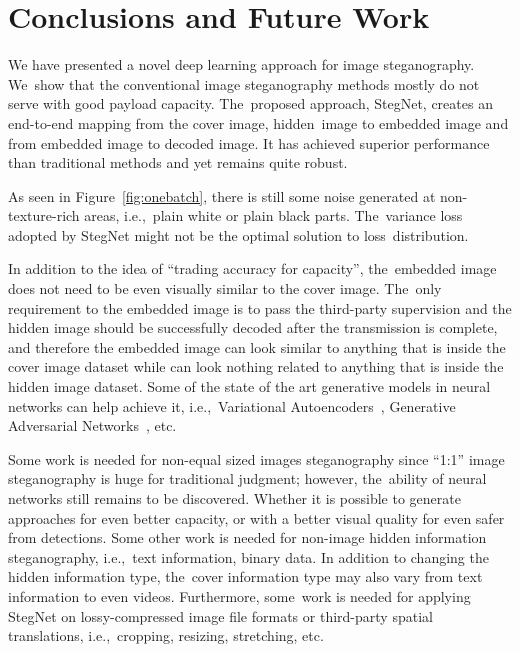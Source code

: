 \documentclass[futureinternet,article,accept,moreauthors,pdftex,10pt,a4paper]{Definitions/mdpi}
\begin{document}
%
\section{Conclusions and Future Work}%
\label{sec:conclusion}

We have presented a novel deep learning approach for image steganography. We~show that the conventional image steganography methods mostly do not serve with good payload capacity. The~proposed approach, StegNet, creates an end-to-end mapping from the cover image, hidden~image to embedded image and from embedded image to decoded image. It has achieved superior performance than traditional methods and yet remains quite robust.

As seen in Figure~\ref{fig:onebatch}, there is still some noise generated at non-texture-rich areas, i.e.,\ plain white or plain black parts. The~variance loss adopted by StegNet might not be the optimal solution to loss~distribution.

In addition to the idea of ``trading accuracy for capacity'', the~embedded image does not need to be even visually similar to the cover image. The~only requirement to the embedded image is to pass the third-party supervision and the hidden image should be successfully decoded after the transmission is complete, and therefore the embedded image can look similar to anything that is inside the cover image dataset while can look nothing related to anything that is inside the hidden image dataset. Some of the state of the art generative models in neural networks can help achieve it, i.e.,\ Variational Autoencoders~\cite{VAE, AAE}, Generative Adversarial Networks~\cite{GAN, WGAN, BEGAN}, etc.

Some work is needed for non-equal sized images steganography since ``1:1'' image steganography is huge for traditional judgment; however, the~ability of neural networks still remains to be discovered. Whether it is possible to generate approaches for even better capacity, or with a better visual quality for even safer from detections. Some other work is needed for non-image hidden information steganography, i.e.,\ text information, binary data. In addition to changing the hidden information type, the~cover information type may also vary from text information to even videos. Furthermore, some~work is needed for applying StegNet on lossy-compressed image file formats or third-party spatial translations, i.e.,\ cropping, resizing, stretching, etc.

\vspace{6pt}
\end{document}
